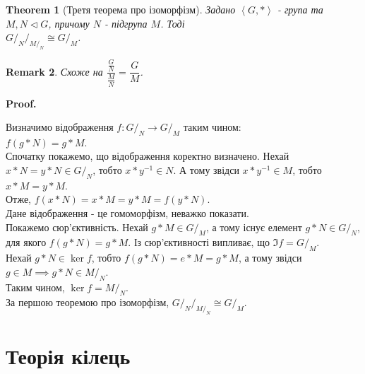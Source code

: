 \documentclass[a4paper, 10pt]{article}
\makeatletter
\theoremstyle{theoremdd}
\newtheorem{theorem}{Theorem}[subsection]
\theoremstyle{theoremdd}
\theoremstyle{theoremdd}
\theoremstyle{theoremdd}
\theoremstyle{theoremdd}
\theoremstyle{theoremdd}
\theoremstyle{theoremdd}
\theoremstyle{theoremdd}
\theoremstyle{theoremdd}
\theoremstyle{theoremdd}
\theoremstyle{theoremdd}
\newtheorem{remark}[theorem]{Remark}
\theoremstyle{theoremdd}
\theoremstyle{theoremdd}
\theoremstyle{theoremdd}
\theoremstyle{theoremdd}
\renewenvironment{proof}[1][Proof.\\]{\par
\pushQED{\hfill \qed}%
\normalfont \topsep6\p@\@plus6\p@\relax
\trivlist
\item\relax
{\bfseries
#1\@addpunct{.}}\hspace\labelsep\ignorespaces
}{%
\popQED\endtrivlist\@endpefalse
}
\makeatother
\begin{document}
\begin{theorem}[Третя теорема про ізоморфізм]
Задано $\left< G, * \right>$ - група та $M,N \triangleleft G$, причому $N$ - підгрупа $M$. Тоді\\
${\scriptstyle G/_N}/_{M/_N} \cong G/_M$.
\end{theorem}

\begin{remark}
Схоже на $\dfrac{\frac{G}{N}}{\frac{M}{N}} = \dfrac{G}{M}$.
\end{remark}

\begin{proof}
Визначимо відображення $f: G/_N \to G/_M$ таким чином:\\
$f(g*N) = g*M$.\\
Спочатку покажемо, що відображення коректно визначено. Нехай $x*N = y*N \in G/_N$, тобто $x*y^{-1} \in N$. А тому звідси $x*y^{-1} \in M$, тобто $x*M = y*M$.\\
Отже, $f(x*N) = x*M = y*M = f(y*N)$.\\
Дане відображення - це гомоморфізм, неважко показати.\\
Покажемо сюр'єктивність. Нехай $g*M \in G/_M$, а тому існує елемент $g*N \in G/_N$, для якого $f(g*N) = g*M$. Із сюр'єктивності випливає, що $\Im f = G/_M$.\\
Нехай $g*N \in \ker f$, тобто $f(g*N) = e*M = g*M$, а тому звідси $g \in M \implies g*N \in M/_N$.\\
Таким чином, $\ker f = M/_N$.\\
За першою теоремою про ізоморфізм, ${\scriptstyle G/_N}/_{M/_N} \cong G/_M$.
\end{proof}
\fi
\newpage

\section{Теорія кілець}
\end{document}
